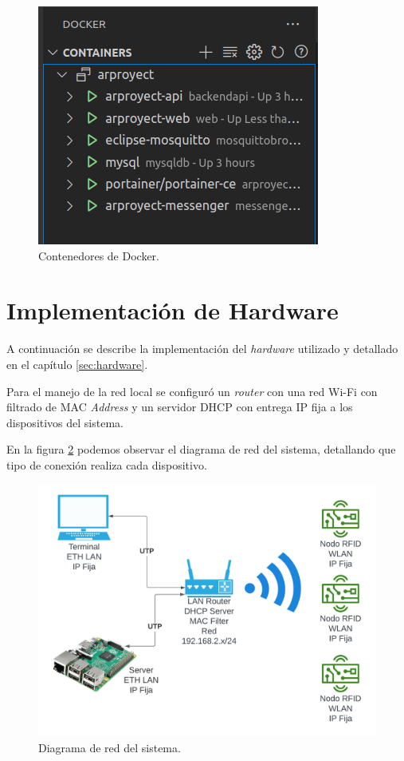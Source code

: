 \begin{figure}[H]
	\centering
	\includegraphics[scale=.60]{./Figures/docker-interfaz.png}
	\caption{Contenedores de Docker.}
	\label{fig:docker-interfaz}
\end{figure}

\section{Implementación de Hardware}
\label{sec:implementacionhw}

A continuación se describe la implementación del \textit{hardware} utilizado y detallado en el capítulo \ref{sec:hardware}.

Para el manejo de la red local se configuró un \textit{router} con una red Wi-Fi con filtrado de MAC \textit{Address} y un servidor DHCP con entrega IP fija a los dispositivos del sistema.

En la figura \ref{fig:diagramared} podemos observar el diagrama de red del sistema, detallando que tipo de conexión realiza cada dispositivo.

\begin{figure}[H]
	\centering
	\includegraphics[width=\textwidth]{./Figures/diagrama-red.png}
	\caption{Diagrama de red del sistema.}
	\label{fig:diagramared}
\end{figure}

